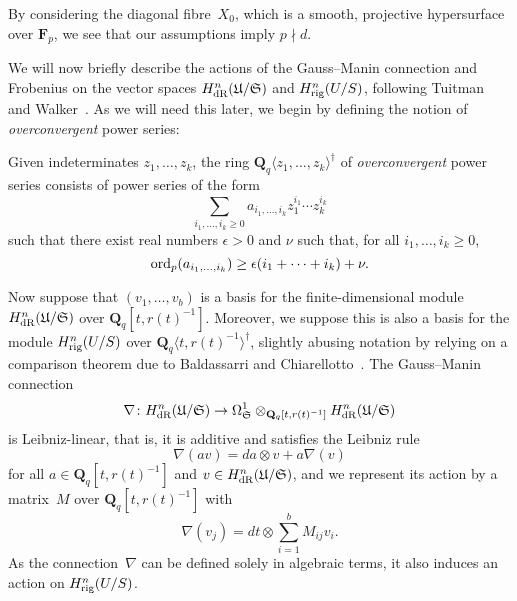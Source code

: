 \begin{rem}
By considering the diagonal fibre~$X_0$, which is a smooth, 
projective hypersurface over $\mathbf{F}_p$, we see that our 
assumptions imply $p \nmid d$.
\end{rem}

We will now briefly describe the actions of the Gauss--Manin connection 
and Frobenius on the vector spaces $H_{\text{dR}}^{n}(\mathfrak{U}/\mathfrak{S})$ 
and $H_{\text{rig}}^{n}(U/S)$, following Tuitman~\citep[\S 3.4.2, \S 3.6.1]{Tuitman2011}
and Walker~\citep[\S 3.2.2.2]{Walker2009}.  As we will need this later, 
we begin by defining the notion of \emph{overconvergent} power series:

\begin{defn} \label{defn:Overconvergence}
Given indeterminates $z_1, \dotsc, z_k$, 
the ring $\mathbf{Q}_q \langle z_1, \dotsc, z_k \rangle^{\dagger}$ of 
\emph{overconvergent} power series consists of power series of the form 
\begin{equation*}
\sum_{i_1,\dotsc,i_k \geq 0} a_{i_1,\dotsc,i_k} z_1^{i_1} \dotsm z_k^{i_k}
\end{equation*}
such that there exist real numbers $\epsilon > 0$ and $\nu$ 
such that, for all $i_1, \dotsc, i_k \geq 0$, 
\begin{equation*}
\operatorname{ord}_p (a_{i_1,\dotsc,i_k}) \geq \epsilon(i_1 + \dotsb + i_k) + \nu.
\end{equation*}
\end{defn}

Now suppose that $(v_1,\dotsc,v_b)$ is a basis for the finite-dimensional 
module $H_{\text{dR}}^{n}(\mathfrak{U}/\mathfrak{S})$ over 
$\mathbf{Q}_q[t,r(t)^{-1}]$.  Moreover, we suppose this is also a basis 
for the module $H_{\text{rig}}^{n}(U/S)$ over 
$\mathbf{Q}_q\langle t, r(t)^{-1} \rangle^{\dagger}$, slightly abusing 
notation by relying on a comparison theorem due to Baldassarri and 
Chiarellotto~\citep{BalChi94}.  The Gauss--Manin connection 
\begin{equation*}
\nabla \colon H_{\text{dR}}^{n}(\mathfrak{U}/\mathfrak{S}) 
    \rightarrow \Omega_{\mathfrak{S}}^{1}
    \otimes_{\mathbf{Q}_q[t,r(t)^{-1}]} H_{\text{dR}}^{n}(\mathfrak{U}/\mathfrak{S})
\end{equation*}
is Leibniz-linear, that is, it is additive and satisfies the Leibniz rule 
\begin{equation*}
\nabla(a v) = da \otimes v + a \nabla(v)
\end{equation*}
for all $a \in \mathbf{Q}_q[t,r(t)^{-1}]$ and 
$v \in H_{\text{dR}}^n(\mathfrak{U}/\mathfrak{S})$, and we represent its 
action by a matrix~$M$ over $\mathbf{Q}_q[t,r(t)^{-1}]$ with 
\begin{equation*}
\nabla(v_j) = dt \otimes \sum_{i=1}^{b} M_{ij} v_i.
\end{equation*}
As the connection~$\nabla$ can be defined solely in algebraic terms, 
it also induces an action on $H_{\text{rig}}^{n}(U/S)$.


